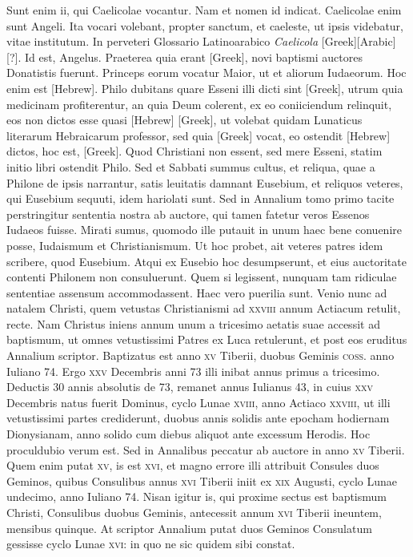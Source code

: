 Sunt enim ii, qui Caelicolae
vocantur.
Nam et nomen id indicat.
Caelicolae enim sunt
Angeli.
Ita vocari volebant, propter sanctum, et caeleste, ut ipsis videbatur,
vitae institutum.
In perveteri Glossario Latinoarabico \textit{Caelicola}
[Greek][Arabic][?].
Id est, Angelus.
Praeterea quia erant \textgreek{[Greek]}, novi
baptismi auctores Donatistis fuerunt.
Princeps eorum vocatur
Maior, ut et aliorum Iudaeorum.
Hoc enim est \texthebrew{[Hebrew]}.
Philo dubitans
quare Esseni illi dicti sint \textgreek{[Greek]},
 utrum quia medicinam profiterentur,
an quia Deum colerent, ex eo coniiciendum relinquit,
eos non dictos esse quasi \texthebrew{[Hebrew]} \textgreek{[Greek]},
 ut volebat quidam Lunaticus
literarum Hebraicarum professor, sed quia \textgreek{[Greek]} vocat, eo ostendit
\texthebrew{[Hebrew]} dictos, hoc est, \textgreek{[Greek]}.
Quod Christiani non essent, sed
mere Esseni, statim initio libri ostendit Philo.
Sed et Sabbati summus
cultus, et reliqua, quae a Philone de ipsis narrantur, satis leuitatis
damnant Eusebium, et reliquos veteres, qui Eusebium sequuti,
idem hariolati sunt.
Sed in Annalium tomo primo tacite perstringitur
sententia nostra ab auctore, qui tamen fatetur veros Essenos Iudaeos
fuisse.
Mirati sumus, quomodo ille putauit in unum haec bene
conuenire posse, Iudaismum et Christianismum.
Ut hoc probet, ait
veteres patres idem scribere, quod Eusebium.
Atqui ex Eusebio
hoc desumpserunt, et eius auctoritate contenti Philonem non consuluerunt.
Quem si legissent, nunquam tam ridiculae sententiae assensum
accommodassent.
Haec vero puerilia sunt.
Venio nunc ad natalem
Christi, quem vetustas Christianismi ad \textsc{xxviii} annum Actiacum
retulit, recte.
Nam Christus iniens annum unum a tricesimo
aetatis suae accessit ad baptismum, ut omnes vetustissimi Patres ex
Luca retulerunt, et post eos eruditus Annalium scriptor.
Baptizatus est anno \textsc{xv} Tiberii, duobus Geminis
 \textsc{coss}. anno Iuliano 74.
Ergo \textsc{xxv} Decembris anni 73 illi inibat annus
 primus a tricesimo.
Deductis 30 annis absolutis de 73, remanet annus Iulianus
43, in cuius \textsc{xxv} Decembris natus fuerit Dominus, cyclo Lunae
\textsc{xviii}, anno Actiaco \textsc{xxviii},
 ut illi vetustissimi partes crediderunt,
duobus annis solidis ante epocham hodiernam Dionysianam,
anno solido cum diebus aliquot ante excessum Herodis.
Hoc proculdubio
verum est.
Sed in Annalibus peccatur ab auctore in anno
\textsc{xv} Tiberii.
Quem enim putat \textsc{xv}, is est \textsc{xvi}, et magno errore illi
attribuit Consules duos Geminos, quibus Consulibus annus \textsc{xvi}
Tiberii iniit ex \textsc{xix} Augusti, cyclo Lunae undecimo, anno Iuliano
74.
Nisan igitur is, qui proxime sectus est baptismum Christi,
Consulibus duobus Geminis, antecessit annum \textsc{xvi} Tiberii ineuntem,
mensibus quinque.
At scriptor Annalium putat duos Geminos
Consulatum gessisse cyclo Lunae \textsc{xvi}: in quo ne sic quidem
sibi constat.

